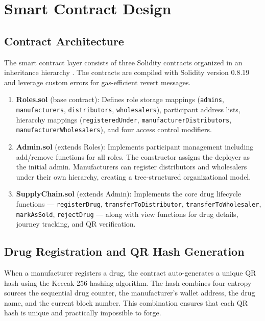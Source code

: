 \documentclass[conference]{IEEEtran}
\begin{document}
\section{Smart Contract Design}

\subsection{Contract Architecture}

The smart contract layer consists of three Solidity contracts organized in an inheritance hierarchy . The contracts are compiled with Solidity version 0.8.19 and leverage custom errors for gas-efficient revert messages.



\begin{enumerate}
\item \textbf{Roles.sol} (base contract): Defines role storage mappings (\texttt{admins}, \texttt{manufacturers}, \texttt{distributors}, \texttt{wholesalers}), participant address lists, hierarchy mappings (\texttt{registeredUnder}, \texttt{manufacturerDistributors}, \texttt{manufacturerWholesalers}), and four access control modifiers.
\item \textbf{Admin.sol} (extends Roles): Implements participant management including add/remove functions for all roles. The constructor assigns the deployer as the initial admin. Manufacturers can register distributors and wholesalers under their own hierarchy, creating a tree-structured organizational model.
\item \textbf{SupplyChain.sol} (extends Admin): Implements the core drug lifecycle functions --- \texttt{registerDrug}, \texttt{transferToDistributor}, \texttt{transferToWholesaler}, \texttt{markAsSold}, \texttt{rejectDrug} --- along with view functions for drug details, journey tracking, and QR verification.
\end{enumerate}

\subsection{Drug Registration and QR Hash Generation}

When a manufacturer registers a drug, the contract auto-generates a unique QR hash using the Keccak-256 hashing algorithm. The hash combines four entropy sources the sequential drug counter, the manufacturer's wallet address, the drug name, and the current block number. This combination ensures that each QR hash is unique and practically impossible to forge.
\end{document}
